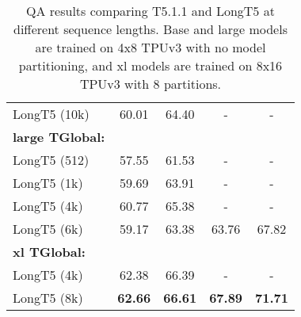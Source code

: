 \documentclass[11pt]{article}
\begin{document}
\begin{table}
\begin{tabular}{lcccc}
LongT5 (10k) & 60.01 & 64.40 & - & - \\
{\bf large TGlobal:} \\
LongT5 (512) & 57.55 & 61.53 & - & - \\
LongT5 (1k) & 59.69 & 63.91 & - & - \\
LongT5 (4k) & 60.77 & 65.38 & - & - \\
LongT5 (6k) & 59.17 & 63.38 & 63.76 & 67.82 \\
{\bf xl TGlobal:} \\
LongT5 (4k) & 62.38 & 66.39 & - & -\\
LongT5 (8k) & {\bf 62.66} & {\bf 66.61} & {\bf 67.89} & {\bf 71.71} \\
\bottomrule
\end{tabular}
\caption{QA results comparing T5.1.1 and LongT5 at different sequence lengths. Base and large models are trained on 4x8 TPUv3 with no model partitioning, and xl models are trained on 8x16 TPUv3 with 8 partitions.}
\label{tab:QA_results_full}
\end{table}
\end{document}

